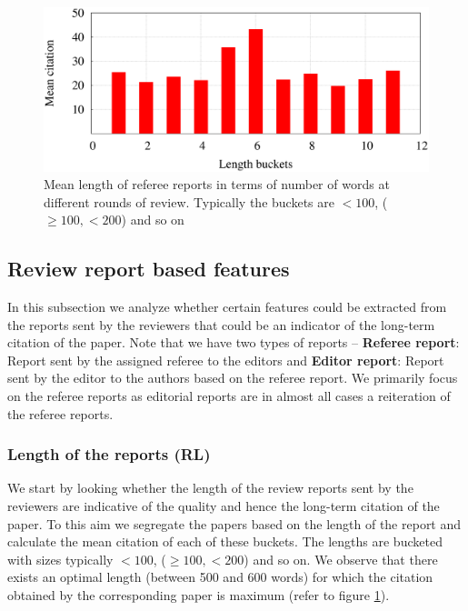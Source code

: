 \begin{figure}
\centering
\includegraphics[scale=0.25]{figures/len_citation.eps}
\caption{Mean length of referee reports in terms of number of words at different rounds of review. Typically the buckets are $< 100$, ($\geq 100, < 200$) and so on}
\label{fig:length}
\vspace{-4mm}
\end{figure}


\subsection{Review report based features}
\label{text_analysis}

In this subsection we analyze whether certain features could be extracted from the reports sent by the reviewers that could be an indicator of the long-term citation of the paper. Note that we have two types of reports -- {\bf Referee report}: Report sent by the assigned referee to the editors and {\bf Editor report}: Report sent by the editor to the authors based on the referee report. We primarily focus on the referee reports as editorial reports are in almost all cases a reiteration of the referee reports.

\subsubsection{Length of the reports (RL)}
We start by looking whether the length of the review reports sent by the reviewers are indicative of the quality and hence the long-term citation of the paper. To this aim we segregate the papers based on the length of the report and calculate the mean citation of each of these buckets. The lengths are bucketed with sizes typically $< 100$, ($\geq 100, < 200$) and so on. We observe that there exists an optimal length (between 500 and 600 words) for which the citation obtained by the corresponding paper is maximum  (refer to figure \ref{fig:length}). 


